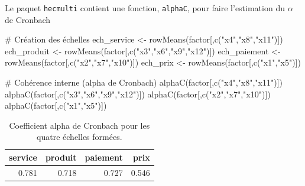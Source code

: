 \documentclass[
  11pt,
  letterpaper,
]{book}
\newenvironment{Shaded}{\begin{snugshade}}{\end{snugshade}}
\newcommand{\CommentTok}[1]{\textcolor[rgb]{0.37,0.37,0.37}{#1}}
\newcommand{\FunctionTok}[1]{\textcolor[rgb]{0.28,0.35,0.67}{#1}}
\newcommand{\NormalTok}[1]{\textcolor[rgb]{0.00,0.23,0.31}{#1}}
\newcommand{\OtherTok}[1]{\textcolor[rgb]{0.00,0.23,0.31}{#1}}
\newcommand{\StringTok}[1]{\textcolor[rgb]{0.13,0.47,0.30}{#1}}
\theoremstyle{definition}
\theoremstyle{remark}
\begin{document}
Le paquet \texttt{hecmulti} contient une fonction, \texttt{alphaC}, pour
faire l'estimation du \(\alpha\) de Cronbach

\begin{Shaded}
\begin{Highlighting}[]
\CommentTok{\# Création des échelles}
\NormalTok{ech\_service }\OtherTok{\textless{}{-}} \FunctionTok{rowMeans}\NormalTok{(factor[,}\FunctionTok{c}\NormalTok{(}\StringTok{"x4"}\NormalTok{,}\StringTok{"x8"}\NormalTok{,}\StringTok{"x11"}\NormalTok{)])}
\NormalTok{ech\_produit }\OtherTok{\textless{}{-}} \FunctionTok{rowMeans}\NormalTok{(factor[,}\FunctionTok{c}\NormalTok{(}\StringTok{"x3"}\NormalTok{,}\StringTok{"x6"}\NormalTok{,}\StringTok{"x9"}\NormalTok{,}\StringTok{"x12"}\NormalTok{)])}
\NormalTok{ech\_paiement }\OtherTok{\textless{}{-}} \FunctionTok{rowMeans}\NormalTok{(factor[,}\FunctionTok{c}\NormalTok{(}\StringTok{"x2"}\NormalTok{,}\StringTok{"x7"}\NormalTok{,}\StringTok{"x10"}\NormalTok{)])}
\NormalTok{ech\_prix }\OtherTok{\textless{}{-}} \FunctionTok{rowMeans}\NormalTok{(factor[,}\FunctionTok{c}\NormalTok{(}\StringTok{"x1"}\NormalTok{,}\StringTok{"x5"}\NormalTok{)])}

\CommentTok{\# Cohérence interne (alpha de Cronbach)}
\FunctionTok{alphaC}\NormalTok{(factor[,}\FunctionTok{c}\NormalTok{(}\StringTok{"x4"}\NormalTok{,}\StringTok{"x8"}\NormalTok{,}\StringTok{"x11"}\NormalTok{)])}
\FunctionTok{alphaC}\NormalTok{(factor[,}\FunctionTok{c}\NormalTok{(}\StringTok{"x3"}\NormalTok{,}\StringTok{"x6"}\NormalTok{,}\StringTok{"x9"}\NormalTok{,}\StringTok{"x12"}\NormalTok{)])}
\FunctionTok{alphaC}\NormalTok{(factor[,}\FunctionTok{c}\NormalTok{(}\StringTok{"x2"}\NormalTok{,}\StringTok{"x7"}\NormalTok{,}\StringTok{"x10"}\NormalTok{)])}
\FunctionTok{alphaC}\NormalTok{(factor[,}\FunctionTok{c}\NormalTok{(}\StringTok{"x1"}\NormalTok{,}\StringTok{"x5"}\NormalTok{)])}
\end{Highlighting}
\end{Shaded}

\hypertarget{tbl-alphaCronbach}{}
\begin{table}
\caption{\label{tbl-alphaCronbach}Coefficient alpha de Cronbach pour les quatre échelles formées. }\tabularnewline

\centering
\begin{tabular}{rrrr}
\toprule
service & produit & paiement & prix\\
\midrule
0.781 & 0.718 & 0.727 & 0.546\\
\bottomrule
\end{tabular}
\end{table}
\end{document}
